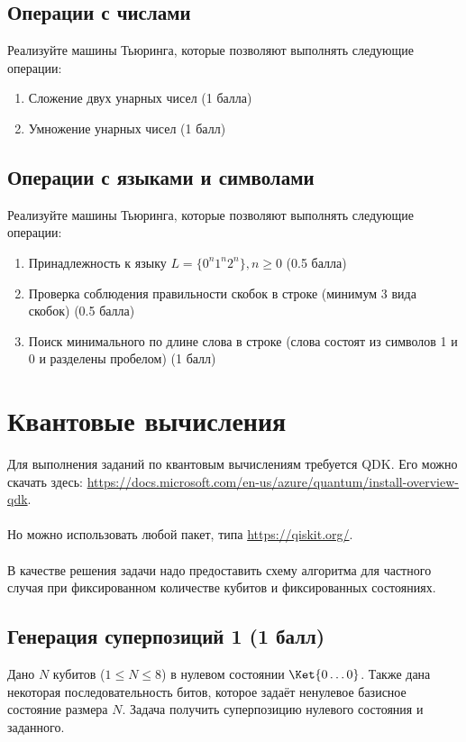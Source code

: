 \documentclass{article}
\begin{document}
\subsection{Операции с числами}

Реализуйте машины Тьюринга, которые позволяют выполнять следующие операции:
\begin{enumerate}
    \item Сложение двух унарных чисел (1 балла)
    \item Умножение унарных чисел (1 балл)
\end{enumerate}


\subsection{Операции с языками и символами}

Реализуйте машины Тьюринга, которые позволяют выполнять следующие операции:
\begin{enumerate}
    \item Принадлежность к языку $L = \{ 0^n1^n2^n \}, n \ge 0$ (0.5 балла)
    \item Проверка соблюдения правильности скобок в строке (минимум 3 вида скобок) (0.5 балла)
    \item Поиск минимального по длине слова в строке (слова состоят из символов 1 и 0 и разделены пробелом) (1 балл)
\end{enumerate}


\section{Квантовые вычисления}

Для выполнения заданий по квантовым вычислениям требуется QDK. Его можно скачать здесь: \url{https://docs.microsoft.com/en-us/azure/quantum/install-overview-qdk}. 
\\\\
Но можно использовать любой пакет, типа \url{https://qiskit.org/}. 
\\\\
В качестве решения задачи надо предоставить схему алгоритма для частного случая при фиксированном количестве кубитов и фиксированных состояниях. 


\subsection{Генерация суперпозиций 1 (1 балл)}

Дано $N$ кубитов ($1 \le N \le 8$) в нулевом состоянии $\Ket{0\dots0}$. Также дана некоторая последовательность битов, которое задаёт ненулевое базисное состояние размера $N$. Задача получить суперпозицию нулевого состояния и заданного.
\end{document}
